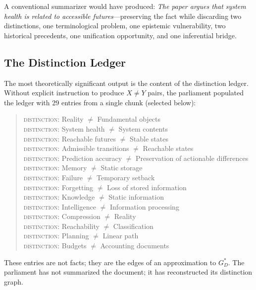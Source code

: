 \documentclass[12pt, a4paper]{article}
\theoremstyle{principle}
\theoremstyle{definition}
\begin{document}
A conventional summarizer would have produced: \emph{The paper argues that system
health is related to accessible futures}---preserving the fact while discarding
two distinctions, one terminological problem, one epistemic vulnerability, two
historical precedents, one unification opportunity, and one inferential bridge.

\subsection{The Distinction Ledger}

The most theoretically significant output is the content of the distinction ledger.
Without explicit instruction to produce $X \neq Y$ pairs, the parliament populated
the ledger with 29 entries from a single chunk (selected below):

\begin{quote}
\textsc{distinction}: Reality $\neq$ Fundamental objects\\
\textsc{distinction}: System health $\neq$ System contents\\
\textsc{distinction}: Reachable futures $\neq$ Stable states\\
\textsc{distinction}: Admissible transitions $\neq$ Reachable states\\
\textsc{distinction}: Prediction accuracy $\neq$ Preservation of actionable differences\\
\textsc{distinction}: Memory $\neq$ Static storage\\
\textsc{distinction}: Failure $\neq$ Temporary setback\\
\textsc{distinction}: Forgetting $\neq$ Loss of stored information\\
\textsc{distinction}: Knowledge $\neq$ Static information\\
\textsc{distinction}: Intelligence $\neq$ Information processing\\
\textsc{distinction}: Compression $\neq$ Reality\\
\textsc{distinction}: Reachability $\neq$ Classification\\
\textsc{distinction}: Planning $\neq$ Linear path\\
\textsc{distinction}: Budgets $\neq$ Accounting documents
\end{quote}

These entries are not facts; they are the edges of an approximation to $G_D^*$.
The parliament has not summarized the document; it has reconstructed its distinction
graph.
\end{document}
